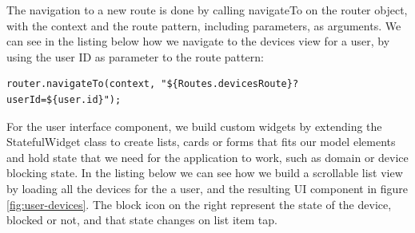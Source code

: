 The navigation to a new route is done by calling navigateTo on the router object, with the context and the route pattern, including parameters, as arguments. We can see in the listing below how we navigate to the devices view for a user, by using the user ID as parameter to the route pattern:

\begin{lstlisting}
router.navigateTo(context, "${Routes.devicesRoute}?userId=${user.id}");
\end{lstlisting}

For the user interface component, we build custom widgets by extending the StatefulWidget class to create lists, cards or forms that fits our model elements and hold state that we need for the application to work, such as domain or device blocking state. In the listing below we can see how we build a scrollable list view by loading all the devices for the a user, and the resulting UI component in figure \ref{fig:user-devices}. The block icon on the right represent the state of the device, blocked or not, and that state changes on list item tap.

